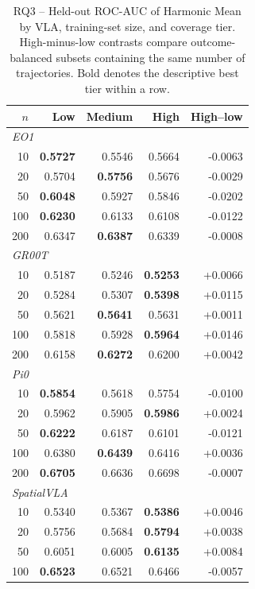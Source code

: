\begin{table}[t]
\centering
\caption{RQ3 -- Held-out ROC-AUC of Harmonic Mean by VLA, training-set size, and coverage tier. High-minus-low contrasts compare outcome-balanced subsets containing the same number of trajectories. Bold denotes the descriptive best tier within a row.}
\label{tab:rq3-reference-performance}
{\scriptsize
\setlength{\tabcolsep}{8pt}
\begin{tabular}{rrrrr}
\toprule
$n$ & Low & Medium & High & High--low \\
\midrule
\multicolumn{5}{l}{\textit{EO1}} \\
10 & \textbf{0.5727} & 0.5546 & 0.5664 & -0.0063 \\
20 & 0.5704 & \textbf{0.5756} & 0.5676 & -0.0029 \\
50 & \textbf{0.6048} & 0.5927 & 0.5846 & -0.0202 \\
100 & \textbf{0.6230} & 0.6133 & 0.6108 & -0.0122 \\
200 & 0.6347 & \textbf{0.6387} & 0.6339 & -0.0008 \\
\midrule
\multicolumn{5}{l}{\textit{GR00T}} \\
10 & 0.5187 & 0.5246 & \textbf{0.5253} & +0.0066 \\
20 & 0.5284 & 0.5307 & \textbf{0.5398} & +0.0115 \\
50 & 0.5621 & \textbf{0.5641} & 0.5631 & +0.0011 \\
100 & 0.5818 & 0.5928 & \textbf{0.5964} & +0.0146 \\
200 & 0.6158 & \textbf{0.6272} & 0.6200 & +0.0042 \\
\midrule
\multicolumn{5}{l}{\textit{Pi0}} \\
10 & \textbf{0.5854} & 0.5618 & 0.5754 & -0.0100 \\
20 & 0.5962 & 0.5905 & \textbf{0.5986} & +0.0024 \\
50 & \textbf{0.6222} & 0.6187 & 0.6101 & -0.0121 \\
100 & 0.6380 & \textbf{0.6439} & 0.6416 & +0.0036 \\
200 & \textbf{0.6705} & 0.6636 & 0.6698 & -0.0007 \\
\midrule
\multicolumn{5}{l}{\textit{SpatialVLA}} \\
10 & 0.5340 & 0.5367 & \textbf{0.5386} & +0.0046 \\
20 & 0.5756 & 0.5684 & \textbf{0.5794} & +0.0038 \\
50 & 0.6051 & 0.6005 & \textbf{0.6135} & +0.0084 \\
100 & \textbf{0.6523} & 0.6521 & 0.6466 & -0.0057 \\

\end{tabular}}
\end{table}
